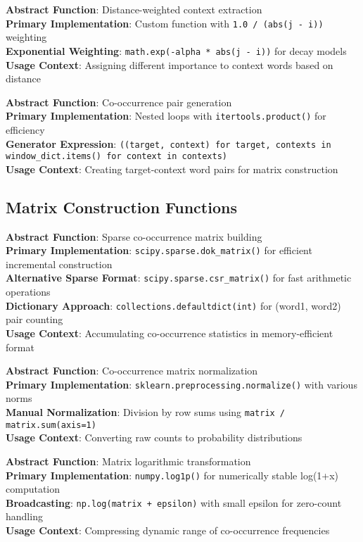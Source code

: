 \documentclass[11pt,a4paper]{article}
\begin{document}
\textbf{Abstract Function}: Distance-weighted context extraction \\
\textbf{Primary Implementation}: Custom function with \texttt{1.0 / (abs(j - i))} weighting \\
\textbf{Exponential Weighting}: \texttt{math.exp(-alpha * abs(j - i))} for decay models \\
\textbf{Usage Context}: Assigning different importance to context words based on distance

\textbf{Abstract Function}: Co-occurrence pair generation \\
\textbf{Primary Implementation}: Nested loops with \texttt{itertools.product()} for efficiency \\
\textbf{Generator Expression}: \texttt{((target, context) for target, contexts in window\_dict.items() for context in contexts)} \\
\textbf{Usage Context}: Creating target-context word pairs for matrix construction

\subsection{Matrix Construction Functions}

\textbf{Abstract Function}: Sparse co-occurrence matrix building \\
\textbf{Primary Implementation}: \texttt{scipy.sparse.dok\_matrix()} for efficient incremental construction \\
\textbf{Alternative Sparse Format}: \texttt{scipy.sparse.csr\_matrix()} for fast arithmetic operations \\
\textbf{Dictionary Approach}: \texttt{collections.defaultdict(int)} for (word1, word2) pair counting \\
\textbf{Usage Context}: Accumulating co-occurrence statistics in memory-efficient format

\textbf{Abstract Function}: Co-occurrence matrix normalization \\
\textbf{Primary Implementation}: \texttt{sklearn.preprocessing.normalize()} with various norms \\
\textbf{Manual Normalization}: Division by row sums using \texttt{matrix / matrix.sum(axis=1)} \\
\textbf{Usage Context}: Converting raw counts to probability distributions

\textbf{Abstract Function}: Matrix logarithmic transformation \\
\textbf{Primary Implementation}: \texttt{numpy.log1p()} for numerically stable log(1+x) computation \\
\textbf{Broadcasting}: \texttt{np.log(matrix + epsilon)} with small epsilon for zero-count handling \\
\textbf{Usage Context}: Compressing dynamic range of co-occurrence frequencies
\end{document}
